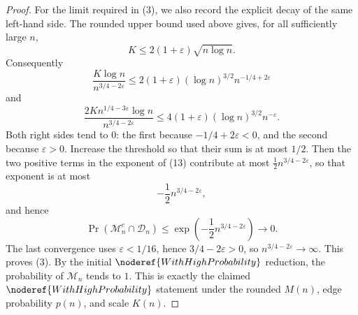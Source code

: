 \begin{proof}
For the limit required in (3), we also record the explicit decay of the same
left-hand side.  The rounded upper bound used above gives, for all sufficiently
large \(n\),
\[
K\le 2(1+\varepsilon)\sqrt{n\log n}.
\]
Consequently
\[
\frac{K\log n}{n^{3/4-2\varepsilon}}
\le
2(1+\varepsilon)(\log n)^{3/2}n^{-1/4+2\varepsilon}
\]
and
\[
\frac{2K n^{1/4-3\varepsilon}\log n}{n^{3/4-2\varepsilon}}
\le
4(1+\varepsilon)(\log n)^{3/2}n^{-\varepsilon}.
\]
Both right sides tend to \(0\): the first because
\(-1/4+2\varepsilon<0\), and the second because \(\varepsilon>0\).  Increase
the threshold so that their sum is at most \(1/2\).  Then the two positive
terms in the exponent of (13) contribute at most
\(\frac12 n^{3/4-2\varepsilon}\), so that exponent is at most
\[
-\frac12 n^{3/4-2\varepsilon},
\]
and hence
\[
\Pr(\mathcal M_n^c\cap\mathcal D_n)
\le \exp\!\left(-\frac12 n^{3/4-2\varepsilon}\right)\to0.
\]
The last convergence uses \(\varepsilon<1/16\), hence
\(3/4-2\varepsilon>0\), so \(n^{3/4-2\varepsilon}\to\infty\).
This proves (3).  By the initial \(\noderef{WithHighProbability}\) reduction,
the probability of \(\mathcal M_n\) tends to \(1\).  This is exactly the
claimed \(\noderef{WithHighProbability}\) statement under the rounded
\(M(n)\), edge probability \(p(n)\), and scale \(K(n)\).
\end{proof}
